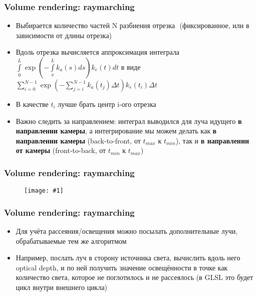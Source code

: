 \documentclass[10pt]{beamer}
\newcommand{\slideimage}[1]{
  \begin{figure}
    \begin{adjustbox}{width=\textwidth, totalheight=\textheight-2\baselineskip-2\baselineskip,keepaspectratio}
      \texttt{[image: \#1]}
    \end{adjustbox}
  \end{figure}
}
\begin{document}
\begin{frame}[fragile]
\frametitle{Volume rendering: raymarching}
\begin{itemize}
\item Выбирается количество частей N разбиения отрезка \begin{math}[t_{min}, t_{max}]\end{math} (фиксированное, или в зависимости от длины отрезка)
\pause
\item Вдоль отрезка вычисляется аппроксимация интеграла \begin{math}\int\limits_0^L \exp\left(-\int\limits_x^L k_a(s) ds\right) k_e(t) dt\end{math} в виде \begin{math}\sum\limits_{i=0}^{N-1} \exp\left(-\sum\limits_{j=i}^{N-1} k_a(t_j) \Delta t\right) k_e(t_i) \Delta t\end{math}
\pause
\item В качестве \begin{math}t_i\end{math} лучше брать центр i-ого отрезка
\pause
\item Важно следить за направлением: интеграл выводился для луча идущего \textbf{в направлении камеры}, а интегрирование мы можем делать как \textbf{в направлении камеры} (back-to-front, от \begin{math}t_{max}\end{math} к \begin{math}t_{min}\end{math}), так и \textbf{в направлении от камеры} (front-to-back, от \begin{math}t_{min}\end{math} к \begin{math}t_{max}\end{math})
\end{itemize}
\end{frame}

\begin{frame}[fragile]
\frametitle{Volume rendering: raymarching}
\slideimage{raymarching-1.png}
\end{frame}

\begin{frame}[fragile]
\frametitle{Volume rendering: raymarching}
\begin{itemize}
\item Для учёта рассеяния/освещения можно посылать дополнительные лучи, обрабатываемые тем же алгоритмом
\pause
\item Например, послать луч в сторону источника света, вычислить вдоль него optical depth, и по ней получить значение освещённости в точке как количество света, которое не поглотилось и не рассеялось (в GLSL это будет цикл внутри внешнего цикла)
\end{itemize}
\end{frame}
\end{document}
